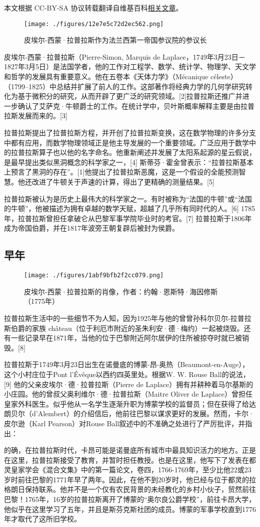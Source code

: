 
本文根据 CC-BY-SA 协议转载翻译自维基百科\href{https://en.wikipedia.org/wiki/Pierre-Simon_Laplace}{相关文章}。

\begin{figure}[ht]
\centering
\texttt{[image: ./figures/12e7e5c72d2ec562.png]}
\caption{皮埃尔-西蒙·拉普拉斯作为法兰西第一帝国参议院的参议长} \label{fig_LPLS_1}
\end{figure}
皮埃尔-西蒙·拉普拉斯（Pierre-Simon, Marquis de Laplace，1749年3月23日－1827年3月5日）是法国学者，他的工作对工程学、数学、统计学、物理学、天文学和哲学的发展具有重要意义。他在五卷本《天体力学》（Mécanique céleste）（1799–1825）中总结并扩展了前人的工作。这部著作将经典力学的几何学研究转化为基于微积分的研究，从而开辟了更广泛的研究领域。[2]拉普拉斯还推广并进一步确认了艾萨克·牛顿爵士的工作。在统计学中，贝叶斯概率解释主要是由拉普拉斯发展而来的。[3]

拉普拉斯提出了拉普拉斯方程，并开创了拉普拉斯变换，这在数学物理的许多分支中都有应用，而数学物理领域正是他主导发展的一个重要领域。广泛应用于数学中的拉普拉斯算子也以他的名字命名。他重新阐述并发展了太阳系起源的星云假说，是最早提出类似黑洞概念的科学家之一，[4] 斯蒂芬·霍金曾表示：“拉普拉斯基本上预言了黑洞的存在”。[1]他提出了拉普拉斯恶魔，这是一个假设的全能预测智慧。他还改进了牛顿关于声速的计算，得出了更精确的测量结果。[5]

拉普拉斯被认为是历史上最伟大的科学家之一。有时被称为“法国的牛顿”或“法国的牛顿”，他被描述为拥有卓越的数学天赋，超越了几乎所有同时代的人。[6] 1785年，拉普拉斯曾担任拿破仑从巴黎军事学院毕业时的考官。[7] 拉普拉斯于1806年成为帝国伯爵，并在1817年波旁王朝复辟后被封为侯爵。
\subsection{早年}
\begin{figure}[ht]
\centering
\texttt{[image: ./figures/1abf9bfb2f2cc079.png]}
\caption{皮埃尔-西蒙·拉普拉斯的肖像，作者：约翰·恩斯特·海因修斯（1775年）} \label{fig_LPLS_2}
\end{figure}
拉普拉斯生活中的一些细节不为人知，因为1925年与他的曾曾孙科尔贝尔-拉普拉斯伯爵的家族 château（位于利厄市附近的圣朱利安·德·梅约）一起被烧毁。还有一些记录早在1871年，当他的位于巴黎附近阿尔居伊的住所被掠夺时就已被销毁。[8]

拉普拉斯于1749年3月23日出生在诺曼底的博蒙-昂-奥热（Beaumont-en-Auge），这个小村庄位于Pont l'Évêque以西约四英里处。根据W. W. Rouse Ball的说法，[9] 他的父亲皮埃尔·德·拉普拉斯（Pierre de Laplace）拥有并耕种着马尔基斯的小庄园。他的曾叔父奥利维尔·德·拉普拉斯（Maitre Oliver de Laplace）曾担任皇家外科医生。似乎他从一名学生逐渐升职为博蒙学校的监督员；但在获得了给达朗贝尔（d'Alembert）的介绍信后，他前往巴黎以谋求更好的发展。然而，卡尔·皮尔逊（Karl Pearson）对Rouse Ball叙述中的不准确之处进行了严厉批评，并指出：

的确，在拉普拉斯时代，卡昂可能是诺曼底所有城市中最具知识活力的地方。正是在这里，拉普拉斯接受了教育，并暂时担任教授。也是在这里，他写下了发表在都灵皇家学会《混合文集》中的第一篇论文，卷四，1766-1769年，至少比他22或23岁时前往巴黎的1771年早了两年。因此，在他不到20岁时，他已经与位于都灵的拉格朗日保持联系。他并不是一个仅有农民背景的未经教化的乡村小伙子，贸然前往巴黎！1765年，16岁的拉普拉斯离开了博蒙的“奥尔良公爵学校”，前往卡昂大学，他似乎在这里学习了五年，并且是斯芬克斯社团的成员。博蒙的军事学校直到1776年才取代了这所旧学校。